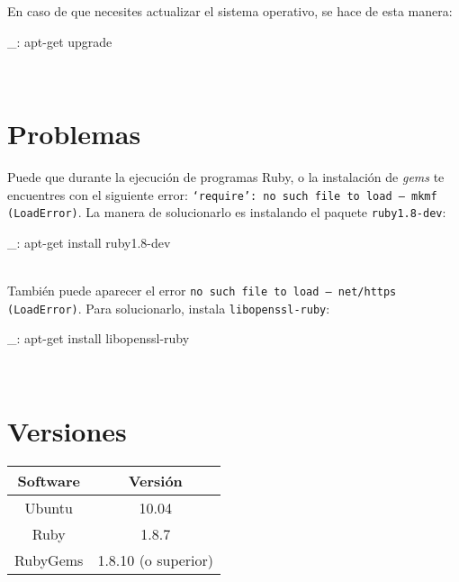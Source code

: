 En caso de que necesites actualizar el sistema operativo, se hace de esta manera:

\begin{bashcode}
_: apt-get upgrade
\end{bashcode}
\\


\section{Problemas}

Puede que durante la ejecución de programas Ruby, o la instalación de \emph{gems} te encuentres con el siguiente error: \texttt{`require': no such file to load -- mkmf (LoadError)}. La manera de solucionarlo es instalando el paquete \texttt{ruby1.8-dev}:

\begin{bashcode}
_: apt-get install ruby1.8-dev
\end{bashcode}
\\

También puede aparecer el error \texttt{no such file to load -- net/https (LoadError)}. Para solucionarlo, instala \texttt{libopenssl-ruby}:

\begin{bashcode}
_: apt-get install libopenssl-ruby
\end{bashcode}
\\


\section{Versiones}

\begin{tabular}{|c|c|}
   \hline
   Software & Versión \\ \hline
   Ubuntu & 10.04 \\ \hline
   Ruby & 1.8.7 \\ \hline
   RubyGems & 1.8.10 (o superior) \\ \hline
\end{tabular}
